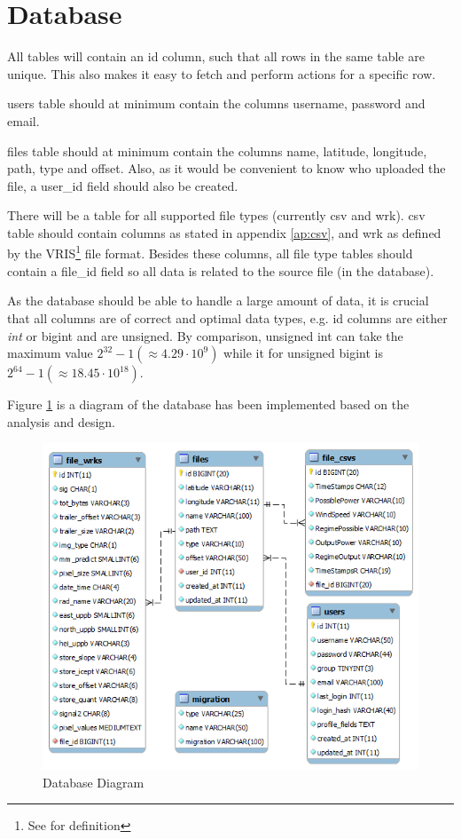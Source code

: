 \section{Database}
\label{sec:database}
All tables will contain an \textsf{id} column, such that all rows in the same table are unique. This also makes it easy to fetch and perform actions for a specific row.

\textsf{users} table should at minimum contain the columns \textsf{username, password} and \textsf{email}.

\textsf{files} table should at minimum contain the columns \textsf{name, latitude, longitude, path, type} and \textsf{offset}.
Also, as it would be convenient to know who uploaded the file, a \textsf{user\_id} field should also be created.

There will be a table for all supported file types (currently \textsf{csv} and \textsf{wrk}). \textsf{csv} table should contain columns as stated in appendix \ref{ap:csv}, and \textsf{wrk} as defined by the VRIS\footnote{See \cite{VRIS} for definition} file format. Besides these columns, all file type tables should contain a \textsf{file\_id} field so all data is related to the source file (in the database).

As the database should be able to handle a large amount of data, it is crucial that all columns are of correct and optimal data types, e.g. \textsf{id} columns are either \textit{int} or \textsf{bigint} and are \textsf{unsigned}. By comparison, \textsf{unsigned int} can take the maximum value $2^{32}-1 (\approx 4.29 \cdot 10^{9})$ while it for \textsf{unsigned bigint} is $ 2^{64}-1 (\approx 18.45 \cdot 10^{18})$.

Figure \ref{fig:dbdiagram} is a diagram of the database has been implemented based on the analysis and design.

\begin{figure}[htbp]
   \centering
   \includegraphics[width=1\linewidth]{figure/db}
   \caption{Database Diagram}
   \label{fig:dbdiagram}
\end{figure}

